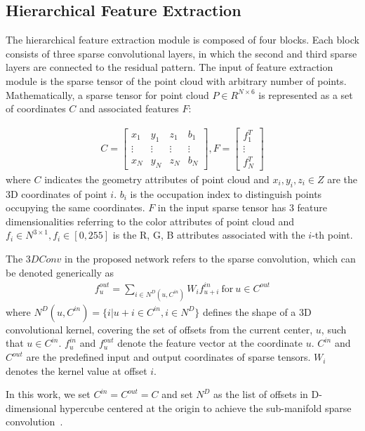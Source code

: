 \documentclass[acmsmall]{acmart}
\begin{document}
\subsection{Hierarchical Feature Extraction}

\par The hierarchical feature extraction module is composed of four blocks. Each block consists of three sparse convolutional layers, in which the second and third sparse layers are connected to the residual pattern. The input of feature extraction module is the sparse tensor of the point cloud with arbitrary number of points. Mathematically, a sparse tensor for point cloud $P \in {R^{N \times 6}}$ is represented as a set of coordinates $C$ and associated features $F$:

\begin{align}
C = \left[ {\begin{array}{*{20}{c}}
{{x_1}}&{{y_1}}&{{z_1}}&{{b_1}}\\
 \vdots & \vdots & \vdots & \vdots \\
{{x_N}}&{{y_N}}&{{z_N}}&{{b_N}}
\end{array}} \right],F = \left[ {\begin{array}{*{20}{c}}
{f_1^T}\\
 \vdots \\
{f_N^T}
\end{array}} \right]
\end{align}
where $C$ indicates the geometry attributes of point cloud and ${x_i},{y_i},{z_i} \in Z$ are the 3D coordinates of point $i$. ${b_i}$ is the occupation index to distinguish points occupying the same coordinates. $F$ in the input sparse tensor has 3 feature dimensionalities referring to the color attributes of point cloud and ${f_i} \in {N^{3\times 1 }},{f_i} \in [0,255]$ is the R, G, B attributes associated with the $i$-th point.

\par The $3DConv$ in the proposed network refers to the sparse convolution, which can be denoted generically as
\begin{align}
f_u^{out} = \sum\limits_{i \in {N^D}(u,{C^{in}})} {{W_i}f_{u + i}^{in}~\text{for}~u \in {C^{out}}}
\end{align}
where ${N^D}(u,{C^{in}}) = \{ i|u + i \in {C^{in}},i \in {N^D}\} $ defines the shape of a 3D convolutional kernel, covering the set of offsets from the current center, $u$, such that $u \in {C^{in}}$. $f_u^{in}$ and $f_u^{out}$ denote the feature vector at the coordinate $u$. ${C^{in}}$ and ${C^{out}}$ are the predefined input and output coordinates of sparse tensors. ${W_i}$ denotes the kernel value at offset $i$.
\par In this work, we set $C^{in}=C^{out}=C$ and set $N^D$ as the list of offsets in D-dimensional hypercube centered at the origin to achieve the sub-manifold sparse convolution~\cite{Graham2017Submanifold}.
\end{document}
